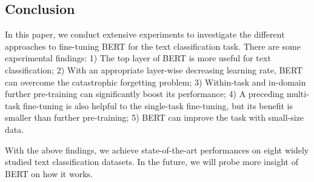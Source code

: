 \documentclass[11pt,a4paper]{article}
\theoremstyle{definition}
\begin{document}
\begin{CJK*}{UTF8}{gbsn}
\section{Conclusion}

In this paper, we conduct extensive experiments to investigate the different approaches to fine-tuning BERT for the text classification task. There are some experimental findings: 1) The top layer of BERT is more useful for text classification; 2) With an appropriate layer-wise decreasing learning rate, BERT can overcome the catastrophic forgetting problem; 3) Within-task and in-domain further pre-training can significantly boost its performance; 4) A preceding multi-task fine-tuning is also helpful to the single-task fine-tuning, but its benefit is smaller than further pre-training; 5) BERT can improve the task with small-size data.

With the above findings, we achieve state-of-the-art performances on eight widely studied text classification datasets. In the future, we will probe more insight of BERT on how it works.




	
	\end{CJK*}
\end{document}
